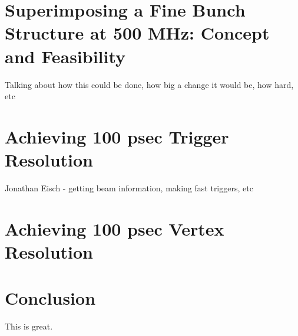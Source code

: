 \documentclass[preprint,12pt]{elsarticle}
\begin{document}
\section{Superimposing a Fine Bunch Structure at 500 MHz: Concept and Feasibility}

Talking about how this could be done, how big a change it would be, how hard, etc

\section{Achieving 100 psec Trigger Resolution}

Jonathan Eisch - getting beam information, making fast triggers, etc

\section{Achieving 100 psec Vertex Resolution}


\section{Conclusion}

This is great.













\end{document}
